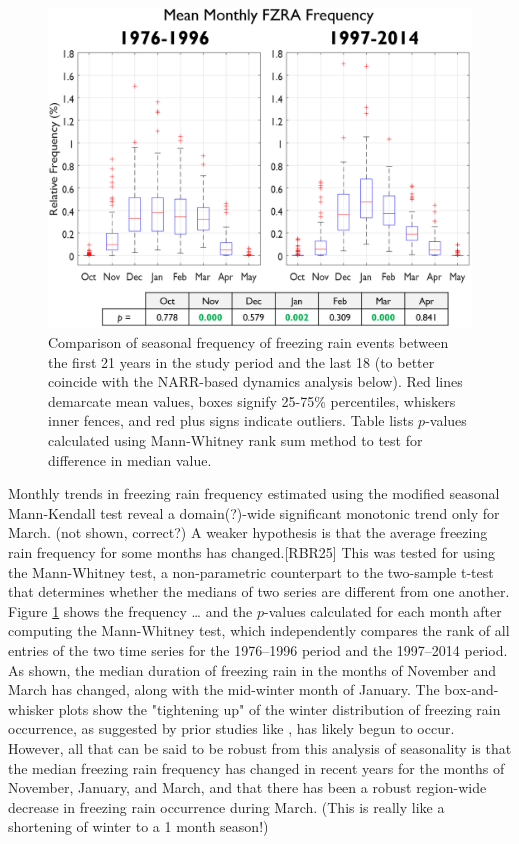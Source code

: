\documentclass[twocol]{ametsoc}
\begin{document}
\begin{figure}
\centering
\includegraphics[width=.9\textwidth]{Seasonal.PNG}
\caption{\label{fig:seasonal} Comparison of seasonal frequency of freezing rain events between the first 21 years in the study period and the last 18 (to better coincide with the NARR-based dynamics analysis below). Red lines demarcate mean values, boxes signify 25-75\% percentiles, whiskers inner fences, and red plus signs indicate outliers. Table lists $p$-values calculated using Mann-Whitney rank sum method to test for difference in median value.}
\end{figure}

Monthly trends in freezing rain frequency estimated using the modified seasonal Mann-Kendall test reveal a domain(?)-wide significant monotonic trend only for March. (not shown, correct?) A weaker hypothesis is that the average freezing rain frequency for some months has changed.[RBR25] This was tested for using the Mann-Whitney test, a non-parametric counterpart to the two-sample t-test that determines whether the medians of two series are different from one another. Figure \ref{fig:seasonal} shows the frequency … and the $p$-values calculated for each month after computing the Mann-Whitney test, which independently compares the rank of all entries of the two time series for the 1976--1996 period and the 1997--2014 period. As shown, the median duration of freezing rain in the months of November and March has changed, along with the mid-winter month of January. The box-and-whisker plots show the "tightening up" of the winter distribution of freezing rain occurrence, as suggested by prior studies like \citet{cheng2011possible}, has likely begun to occur. However, all that can be said to be robust from this analysis of seasonality is that the median freezing rain frequency has changed in recent years for the months of November, January, and March, and that there has been a robust region-wide decrease in freezing rain occurrence during March. (This is really like a shortening of winter to a 1 month season!)
\end{document}
